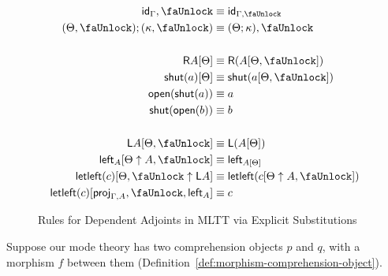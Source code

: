 \documentclass[10pt]{article}
\theoremstyle{definition}
\newcommand{\CTX}{\,\,\mathsf{Ctx}}
\newcommand{\TYPE}{\,\,\mathsf{Type}}
\newcommand{\id}{\mathsf{id}}
\newcommand{\qyields}{\Vdash}
\newcommand\proj[1]{\ensuremath{\mathsf{proj}_{#1}}}
\newcommand{\lock}{\text{\faUnlock}}
\newcommand{\Rtype}[1]{\mathsf{R}{#1}}
\newcommand{\RI}[1]{\mathsf{shut}({#1})}
\newcommand{\RE}[1]{\mathsf{open}({#1})}
\newcommand{\Ltype}[1]{\mathsf{L}{#1}}
\newcommand{\LI}[1]{\mathsf{left}_{#1}}
\newcommand{\LE}[1]{\mathsf{letleft}({#1})}
\begin{document}
\begin{figure}
\begin{align}
\id_\Gamma , \lock &\equiv \id_{\Gamma, \lock} \\
(\Theta, \lock) ; (\kappa, \lock) &\equiv (\Theta ; \kappa), \lock \\
\nonumber \\
\Rtype{A}[\Theta] &\equiv \Rtype{(A[\Theta, \lock])} \\
\RI{a}[\Theta] &\equiv \RI{a[\Theta, \lock]} \\
\RE{\RI{a}} &\equiv a \\
\RI{\RE{b}} &\equiv b \\
\nonumber \\
\Ltype{A}[\Theta, \lock] &\equiv \Ltype{(A[\Theta])} \\
\LI{A}[\Theta \uparrow A, \lock] &\equiv \LI{A[\Theta]} \\
\LE{c}[\Theta, \lock \uparrow \Ltype{A}] &\equiv \LE{c[\Theta \uparrow A, \lock]} \\
\LE{c}[\proj{\Gamma, A}, \lock, \LI{A}] &\equiv c
\end{align}
\caption{Rules for Dependent Adjoints in MLTT via Explicit Substitutions}\label{fig:qit-adjoint-rules}
\end{figure}

Suppose our mode theory has two comprehension objects $p$ and $q$, with a morphism $f$ between them (Definition~\ref{def:morphism-comprehension-object}). 
\end{document}
